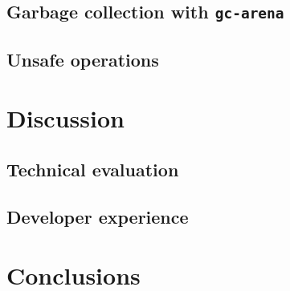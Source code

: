 \documentclass[12pt]{article}
\begin{document}
    \subsection{Garbage collection with \texttt{gc-arena}}
    
    \subsection{Unsafe operations}

    \section{Discussion}

    \subsection{Technical evaluation}

    \subsection{Developer experience}

    \section{Conclusions}
\end{document}
